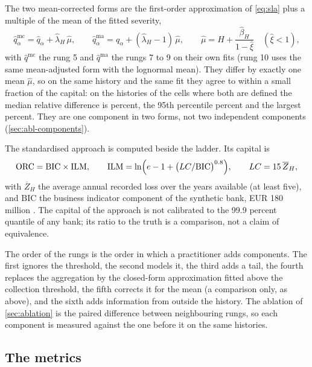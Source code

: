The two mean-corrected forms are the first-order approximation of \cref{eq:sla} plus a multiple of the mean of the fitted severity,
\begin{equation}
\hat q^{\mathrm{mc}}_\alpha=\hat q_\alpha+\hat\lambda_H\,\hat\mu,\qquad \hat q^{\mathrm{ma}}_\alpha=\hat q_\alpha+(\hat\lambda_H-1)\,\hat\mu,\qquad \hat\mu=H+\frac{\hat\beta_H}{1-\hat\xi}\quad(\hat\xi<1),
\label{eq:mean-corrections}
\end{equation}
with $\hat q^{\mathrm{mc}}$ the rung 5 and $\hat q^{\mathrm{ma}}$ the rungs 7 to 9 on their own fits (rung 10 uses the same mean-adjusted form with the lognormal mean). They differ by exactly one mean $\hat\mu$, so on the same history and the same fit they agree to within a small fraction of the capital: on the \rFiveSevenPairs{} histories of the \rFiveSevenCells{} cells where both are defined the median relative difference is \rFiveSevenMed{} percent, the 95th percentile \rFiveSevenPct{} percent and the largest \rFiveSevenMax{} percent. They are one component in two forms, not two independent components (\cref{sec:abl-components}).

The standardised approach is computed beside the ladder. Its capital is
\begin{equation}
\mathrm{ORC}=\mathrm{BIC}\times\mathrm{ILM},\qquad \mathrm{ILM}=\ln\Bigl(e-1+\bigl(LC/\mathrm{BIC}\bigr)^{0.8}\Bigr),\qquad LC=15\,\overline{Z}_H,
\label{eq:sma}
\end{equation}
with $\overline{Z}_H$ the average annual recorded loss over the years available (at least five), and $\mathrm{BIC}$ the business indicator component of the synthetic bank, EUR 180 million \citep{ope25}. The capital of the approach is not calibrated to the 99.9 percent quantile of any bank; its ratio to the truth is a comparison, not a claim of equivalence.

The order of the rungs is the order in which a practitioner adds components. The first ignores the threshold, the second models it, the third adds a tail, the fourth replaces the aggregation by the closed-form approximation fitted above the collection threshold, the fifth corrects it for the mean (a comparison only, as above), and the sixth adds information from outside the history. The ablation of \cref{sec:ablation} is the paired difference between neighbouring rungs, so each component is measured against the one before it on the same histories.

\subsection{The metrics}
\label{sec:pm-metrics}

